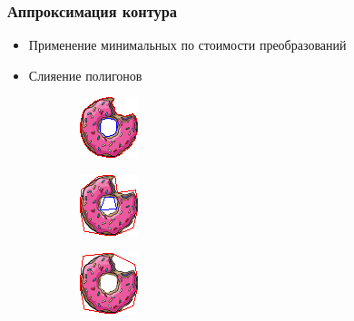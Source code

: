 \documentclass[10pt, unicode]{beamer}
\begin{document}
    \begin{frame}
        \frametitle{Аппроксимация контура}
        \begin{itemize}
            \item Применение минимальных по стоимости преобразований
            \item Слияение полигонов
        \end{itemize}
        \begin{figure}[H]
            \centering
            \begin{subfigure}[l]{0.33\linewidth}
                \centering
                \includegraphics[scale=1.5]{donutpixel_approx_start.png}
            \end{subfigure}
            \begin{subfigure}{0.33\linewidth}
                \centering
                \includegraphics[scale=1.5]{donutpixel_approx_mid.png}
            \end{subfigure}\begin{subfigure}{0.33\linewidth}
                \centering
                \includegraphics[scale=1.5]{donutpixel_approx_end.png}
            \end{subfigure}
        \end{figure}
    \end{frame}
\end{document}
